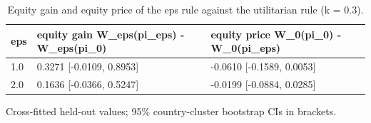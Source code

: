 \begin{table}[htbp]
\centering
\caption{Equity gain and equity price of the eps rule against the utilitarian rule (k = 0.3).}
\label{tab:agri_equity}
\begin{tabular}{lll}
\toprule
eps & equity gain W\_eps(pi\_eps) - W\_eps(pi\_0) & equity price W\_0(pi\_0) - W\_0(pi\_eps) \\
\midrule
1.0 & 0.3271 [-0.0109, 0.8953] & -0.0610 [-0.1589, 0.0053] \\
2.0 & 0.1636 [-0.0366, 0.5247] & -0.0199 [-0.0884, 0.0285] \\
\bottomrule
\end{tabular}
\par\smallskip\footnotesize Cross-fitted held-out values; 95\% country-cluster bootstrap CIs in brackets.
\end{table}
